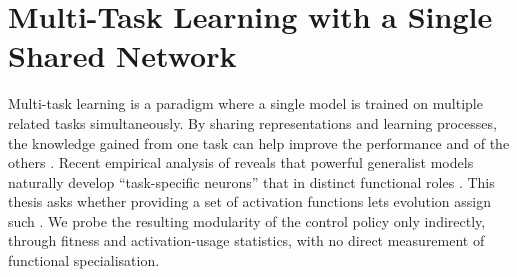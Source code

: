 \section{Multi-Task Learning with a Single Shared Network}
\label{subsec:multi-task-learning-with-a-single}


Multi-task learning is a paradigm where a single model is trained on multiple related tasks simultaneously.
By sharing representations and learning processes, the knowledge gained from one task can help improve the performance and  of the others \parencite{zhang_survey_2021}.
Recent empirical analysis of  reveals that powerful generalist models naturally develop ``task-specific neurons'' that  in distinct functional roles \parencite{leng_understanding_2025}.
This thesis asks whether providing a set of activation functions lets evolution assign such  . We probe the resulting modularity of the control policy only indirectly, through fitness and activation-usage statistics, with no direct measurement of functional specialisation.

